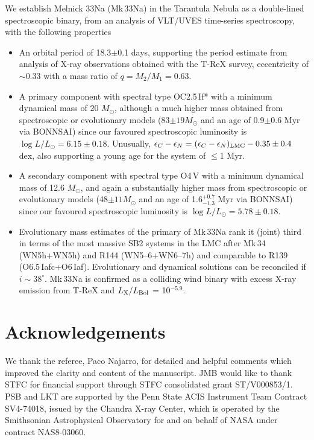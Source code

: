 \documentclass[fleqn,usenatbib]{mnras}
\begin{document}
We establish Melnick 33Na (Mk\,33Na) in the Tarantula Nebula as a double-lined spectroscopic binary, from an analysis of VLT/UVES time-series spectroscopy,
with the following properties
\begin{itemize}
\item An orbital period of 18.3$\pm$0.1 days, supporting the period estimate from analysis of X-ray observations obtained with the T-ReX survey, eccentricity of $\sim$0.33 with a mass ratio of $q = M_{2}/M_{1} = 0.63$. 
\item A primary component with spectral type OC2.5\,If* with a minimum dynamical mass of 20 $M_{\odot}$, although a much higher mass obtained from spectroscopic or evolutionary models (83$\pm19 M_{\odot}$ and an age of 0.9$\pm$0.6 Myr via BONNSAI) since our favoured spectroscopic luminosity is $\log L/L_{\odot} = 6.15 \pm 0.18$. Unusually, $\epsilon_{C} - \epsilon_{N} = (\epsilon_{C} - \epsilon_{N})_{\rm LMC} - 0.35 \pm 0.4$ dex, also supporting a young age for the system of $\leq$1 Myr.
\item A secondary component with spectral type O4\,V with a minimum dynamical mass of 12.6 $M_{\odot}$, and again a substantially higher mass from spectroscopic or evolutionary models 
(48$\pm11 M_{\odot}$ and an age of 1.6$^{+0.7}_{-1.3}$ Myr via BONNSAI) since our favoured spectroscopic luminosity is $\log L/L_{\odot} = 5.78 \pm 0.18$. 
\item Evolutionary mass estimates of the primary of Mk\,33Na rank it (joint) third in terms of the most massive SB2 systems in the LMC after Mk\,34 (WN5h+WN5h) and R144 (WN5--6+WN6--7h) and comparable to R139 (O6.5\,Iafc+O6\,Iaf). Evolutionary and dynamical solutions can be reconciled if $i \sim 38^{\circ}$. Mk\,33Na is confirmed as a colliding wind binary with excess X-ray emission from T-ReX and $L_{\rm X}/L_{\rm Bol}$ = 10$^{-5.9}$.
\end{itemize}

\section*{Acknowledgements}
We thank the referee, Paco Najarro, for detailed and helpful comments which improved the clarity and content of the manuscript. JMB would like to thank STFC for financial support through STFC consolidated grant ST/V000853/1. PSB and LKT are supported by the Penn State ACIS Instrument Team Contract SV4-74018, issued by the Chandra X-ray Center, which is operated by the Smithsonian Astrophysical Observatory for and on behalf of NASA under contract NAS8-03060.
\end{document}
